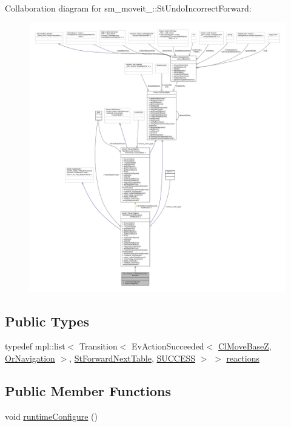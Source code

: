 Collaboration diagram for sm\+\_\+moveit\+\_\+:\+:St\+Undo\+Incorrect\+Forward\+:
\nopagebreak
\begin{figure}[H]
\begin{center}
\leavevmode
\includegraphics[width=350pt]{structsm__moveit__2_1_1StUndoIncorrectForward__coll__graph}
\end{center}
\end{figure}
\subsection*{Public Types}
\begin{DoxyCompactItemize}
\item 
typedef mpl\+::list$<$ Transition$<$ Ev\+Action\+Succeeded$<$ \hyperlink{classcl__move__base__z_1_1ClMoveBaseZ}{Cl\+Move\+BaseZ}, \hyperlink{classsm__moveit__2_1_1OrNavigation}{Or\+Navigation} $>$, \hyperlink{structsm__moveit__2_1_1StForwardNextTable}{St\+Forward\+Next\+Table}, \hyperlink{classSUCCESS}{S\+U\+C\+C\+E\+SS} $>$ $>$ \hyperlink{structsm__moveit__2_1_1StUndoIncorrectForward_a0408fb0dbb784b6238a26b57744b59da}{reactions}
\end{DoxyCompactItemize}
\subsection*{Public Member Functions}
\begin{DoxyCompactItemize}
\item 
void \hyperlink{structsm__moveit__2_1_1StUndoIncorrectForward_abb9a4fb1b70eaf646395db1c3075da39}{runtime\+Configure} ()
\end{DoxyCompactItemize}
